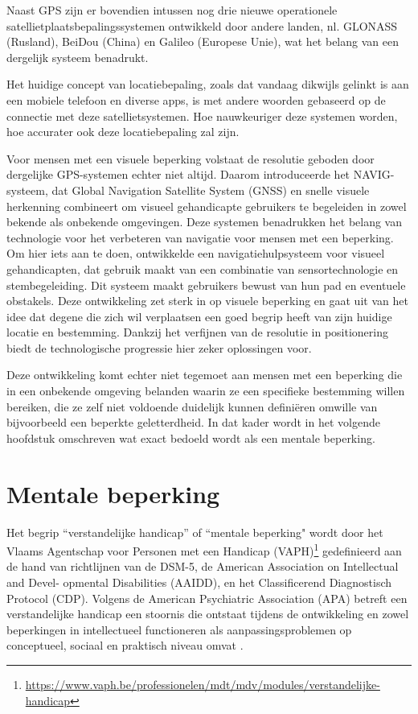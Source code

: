 Naast GPS zijn er bovendien intussen nog drie nieuwe operationele satellietplaatsbepalingssystemen ontwikkeld door andere landen, nl. GLONASS (Rusland), BeiDou (China) en Galileo (Europese Unie), wat het belang van een dergelijk systeem benadrukt. 

Het huidige concept van locatiebepaling, zoals dat vandaag dikwijls gelinkt is aan een mobiele telefoon en diverse apps, is met andere woorden gebaseerd op de connectie met deze satellietsystemen. Hoe nauwkeuriger deze systemen worden, hoe accurater ook deze locatiebepaling zal zijn. 

Voor mensen met een visuele beperking volstaat de resolutie geboden door dergelijke GPS-systemen echter niet altijd. Daarom introduceerde \textcite{Katz2010} het NAVIG-systeem, dat Global Navigation Satellite System (GNSS) en snelle visuele herkenning combineert om visueel gehandicapte gebruikers te begeleiden in zowel bekende als onbekende omgevingen. Deze systemen benadrukken het belang van technologie voor het verbeteren van navigatie voor mensen met een beperking. Om hier iets aan te doen, ontwikkelde  
\textcite{Lakde2015} een navigatiehulpsysteem voor visueel gehandicapten, dat gebruik maakt van een combinatie van sensortechnologie en stembegeleiding. Dit systeem maakt gebruikers bewust van hun pad en eventuele obstakels. Deze ontwikkeling zet sterk in op visuele beperking en gaat uit van het idee dat degene die zich wil verplaatsen een goed begrip heeft van zijn huidige locatie en bestemming. Dankzij het verfijnen van de resolutie in positionering biedt de technologische progressie hier zeker oplossingen voor. 

Deze ontwikkeling komt echter niet tegemoet aan mensen met een beperking die in een onbekende omgeving belanden waarin ze een specifieke bestemming willen bereiken, die ze zelf niet voldoende duidelijk kunnen definiëren omwille van bijvoorbeeld een beperkte geletterdheid. In dat kader wordt in het volgende hoofdstuk omschreven wat exact bedoeld wordt als een mentale beperking. 

\section{Mentale beperking}
\label{sec:mentale-beperking}

Het begrip ``verstandelijke handicap'' of ``mentale beperking" wordt door het Vlaams Agentschap voor Personen met een Handicap (VAPH)\footnote{\url{https://www.vaph.be/professionelen/mdt/mdv/modules/verstandelijke-handicap}} gedefinieerd aan de hand van richtlijnen van de DSM-5, de American Association on Intellectual and Devel- opmental Disabilities (AAIDD), en het Classificerend Diagnostisch Protocol (CDP). Volgens de American Psychiatric Association (APA) betreft een verstandelijke handicap een stoornis die ontstaat tijdens de ontwikkeling en zowel beperkingen in intellectueel functioneren als aanpassingsproblemen op conceptueel, sociaal en praktisch niveau omvat \autocite{APA2022}.

